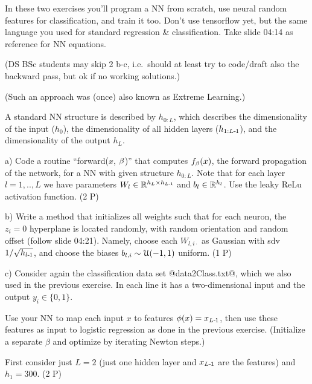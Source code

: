 

\renewcommand{\course}{Machine Learning}
\renewcommand{\exnum}{5}

\exercises


In these two exercises you'll program a NN from scratch, use neural random features for classification, and train it too. Don't use tensorflow yet, but the same language you used for standard regression \& classification. Take slide 04:14 as reference for NN equations.

(DS BSc students may skip 2 b-c, i.e.\ should at least try to code/draft also the backward pass, but ok if no working solutions.)



(Such an approach was (once) also known as Extreme Learning.)

A standard NN structure is described by $h_{0:L}$, which  describes the dimensionality of the input ($h_0$), the dimensionality of all hidden layers ($h_{1:L{{\hspace*{-.0pt}\text{\rm -}\hspace*{-.5pt}}1}}$), and the dimensionality of the output $h_L$.

a) Code a routine ``forward($x$, $\beta$)'' that computes $f_\beta(x)$, the
forward propagation of the network, for a NN with given structure $h_{0:L}$. Note that for each layer $l=1,..,L$ we have parameters $W_l\in{\mathbb{R}}^{h_L\times h_{L{{\hspace*{-.0pt}\text{\rm -}\hspace*{-.5pt}}1}}}$ and $b_l \in {\mathbb{R}}^{h_l}$. Use the leaky ReLu activation function. (2 P)

b) Write a method that initializes all weights such that for each neuron, the $z_i=0$ hyperplane is located randomly, with random orientation and random offset (follow slide 04:21). Namely, choose each $W_{l,i\cdot}$ as Gaussian with sdv $1/\sqrt{h_{l{{\hspace*{-.0pt}\text{\rm -}\hspace*{-.5pt}}1}}}$, and choose the biases $b_{l,i} \sim {\cal U}(-1,1)$ uniform. (1 P)

c) Consider again the classification data set @data2Class.txt@, which we also used in the previous exercise. In each line it has a two-dimensional input and the output $y_i\in\{0,1\}$.

Use your NN to map each input $x$ to features $\phi(x) = x_{L{{\hspace*{-.0pt}\text{\rm -}\hspace*{-.5pt}}1}}$, then use these features as input to logistic regression as done in the previous exercise.
(Initialize a separate $\beta$ and optimize by iterating Newton steps.)

First consider just $L=2$ (just one hidden layer and $x_{L{{\hspace*{-.0pt}\text{\rm -}\hspace*{-.5pt}}1}}$ are the features) and $h_1=300$. (2 P)

